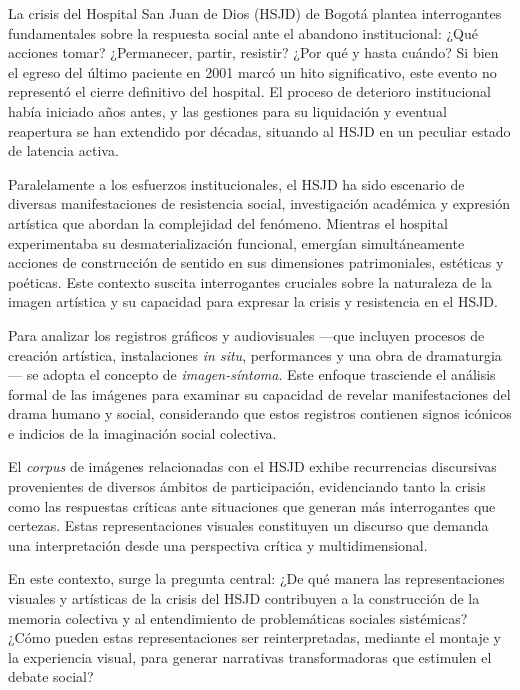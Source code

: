 La crisis del Hospital San Juan de Dios (HSJD) de Bogotá plantea interrogantes fundamentales sobre la respuesta social ante el abandono institucional: ¿Qué acciones tomar? ¿Permanecer, partir, resistir? ¿Por qué y hasta cuándo? Si bien el egreso del último paciente en 2001 marcó un hito significativo, este evento no representó el cierre definitivo del hospital. El proceso de deterioro institucional había iniciado años antes, y las gestiones para su liquidación y eventual reapertura se han extendido por décadas, situando al HSJD en un peculiar estado de latencia activa.

Paralelamente a los esfuerzos institucionales, el HSJD ha sido escenario de diversas manifestaciones de resistencia social, investigación académica y expresión artística que abordan la complejidad del fenómeno. Mientras el hospital experimentaba su desmaterialización funcional, emergían simultáneamente acciones de construcción de sentido en sus dimensiones patrimoniales, estéticas y poéticas. Este contexto suscita interrogantes cruciales sobre la naturaleza de la imagen artística y su capacidad para expresar la crisis y resistencia en el HSJD.

Para analizar los registros gráficos y audiovisuales —que incluyen procesos de creación artística, instalaciones \textit{in situ}, performances y una obra de dramaturgia— se adopta el concepto de \textit{imagen-síntoma}. Este enfoque trasciende el análisis formal de las imágenes para examinar su capacidad de revelar manifestaciones del drama humano y social, considerando que estos registros contienen signos icónicos e indicios de la imaginación social colectiva.

El \textit{corpus} de imágenes relacionadas con el HSJD exhibe recurrencias discursivas provenientes de diversos ámbitos de participación, evidenciando tanto la crisis como las respuestas críticas ante situaciones que generan más interrogantes que certezas. Estas representaciones visuales constituyen un discurso que demanda una interpretación desde una perspectiva crítica y multidimensional.

En este contexto, surge la pregunta central: ¿De qué manera las representaciones visuales y artísticas de la crisis del HSJD contribuyen a la construcción de la memoria colectiva y al entendimiento de problemáticas sociales sistémicas? ¿Cómo pueden estas representaciones ser reinterpretadas, mediante el montaje y la experiencia visual, para generar narrativas transformadoras que estimulen el debate social?

